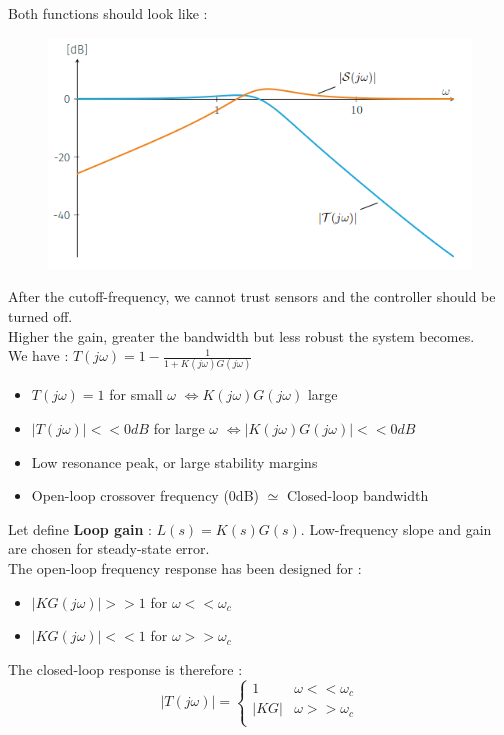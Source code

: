 \documentclass[../main.tex]{subfiles}
\begin{document}
Both functions should look like : \begin{figure}[hbt!]
    \centering
    \includegraphics[width=.5\textwidth]{IMAGES/control/sensitivity2.png}
\end{figure}

\warning After the cutoff-frequency, we cannot trust sensors and the controller should be turned off.\\
Higher the gain, greater the bandwidth but less robust the system becomes.\\

We have : $T(j\omega) = 1-\frac{1}{1+K(j\omega)G(j\omega)}$ \begin{itemize}
    \item $T(j\omega) = 1$ for small $\omega$ $\Leftrightarrow K(j\omega)G(j\omega)$ large\\
    \item $\lvert T(j\omega)\rvert <<0dB$ for large $\omega$ $\Leftrightarrow \lvert K(j\omega)G(j\omega) \rvert<<0dB$\\
    \item Low resonance peak, or large stability margins\\
    \item Open-loop crossover frequency (0dB) $\simeq$ Closed-loop bandwidth\\
\end{itemize}

Let define \textbf{Loop gain} : $L(s) = K(s)G(s)$. Low-frequency slope and gain are chosen for steady-state error.\\
The open-loop frequency response has been designed for : \begin{itemize}
    \item $\lvert KG(j\omega)\rvert >>1$ for $\omega<<\omega_c$\\
    \item $\lvert KG(j\omega)\rvert <<1$ for $\omega >> \omega_c$\\
\end{itemize}

The closed-loop response is therefore : \begin{equation}
    \lvert T(j\omega)\rvert = \begin{cases}
        1 & \omega << \omega_c\\
        \lvert KG\rvert & \omega>> \omega_c\\
    \end{cases}
\end{equation}
\end{document}
